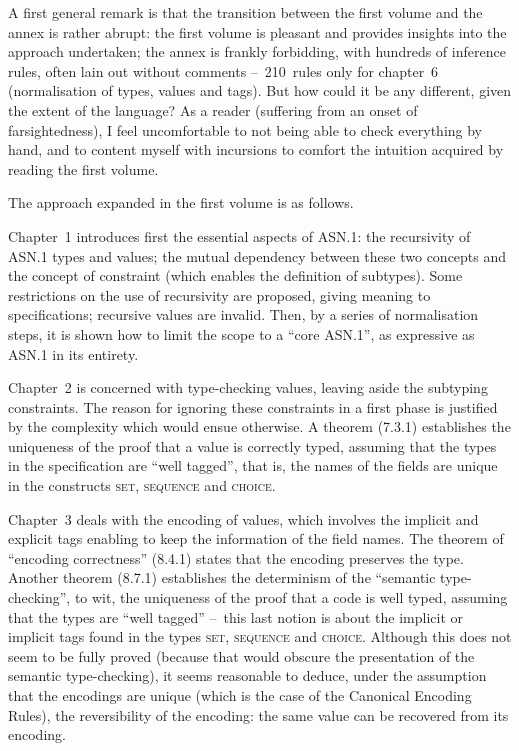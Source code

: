 \documentclass[a4paper,11pt,twoside]{article}
\begin{document}
A first general remark is that the transition between the first volume
and the annex is rather abrupt: the first volume is pleasant and
provides insights into the approach undertaken; the annex is frankly
forbidding, with hundreds of inference rules, often lain out without
comments --~210~rules only for chapter~6 (normalisation of types,
values and tags). But how could it be any different, given the extent
of the language? As a reader (suffering from an onset of
farsightedness), I feel uncomfortable to not being able to check
everything by hand, and to content myself with incursions to comfort
the intuition acquired by reading the first volume.

The approach expanded in the first volume is as follows.

Chapter~1 introduces first the essential aspects of ASN.1: the
recursivity of ASN.1 types and values; the mutual dependency between
these two concepts and the concept of constraint (which enables the
definition of subtypes). Some restrictions on the use of recursivity
are proposed, giving meaning to specifications; recursive values are
invalid. Then, by a series of normalisation steps, it is shown how to
limit the scope to a ``core ASN.1'', as expressive as ASN.1 in its
entirety.

Chapter~2 is concerned with type-checking values, leaving aside the
subtyping constraints. The reason for ignoring these constraints in a
first phase is justified by the complexity which would ensue
otherwise. A theorem (7.3.1) establishes the uniqueness of the proof
that a value is correctly typed, assuming that the types in the
specification are ``well tagged'', that is, the names of the fields
are unique in the constructs \textsc{set}, \textsc{sequence} and
\textsc{choice}.

Chapter~3 deals with the encoding of values, which involves the
implicit and explicit tags enabling to keep the information of the
field names. The theorem of ``encoding correctness'' (8.4.1) states
that the encoding preserves the type. Another theorem (8.7.1)
establishes the determinism of the ``semantic type-checking'', to wit,
the uniqueness of the proof that a code is well typed, assuming that
the types are ``well tagged'' --~this last notion is about the
implicit or implicit tags found in the types \textsc{set},
\textsc{sequence} and \textsc{choice}. Although this does not seem to
be fully proved (because that would obscure the presentation of the
semantic type-checking), it seems reasonable to deduce, under the
assumption that the encodings are unique (which is the case of the
Canonical Encoding Rules), the reversibility of the encoding: the same
value can be recovered from its encoding.
\end{document}
